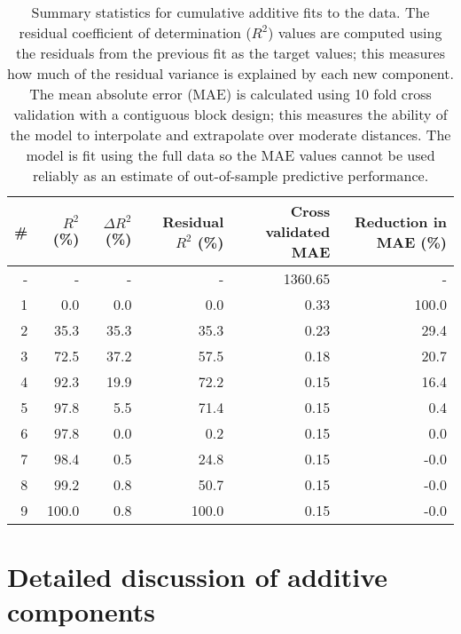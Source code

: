 \documentclass{article} %
\begin{document}
\begin{table}[htb]
\begin{center}
{\small
\begin{tabular}{|r|rrrrr|}
\hline
\bf{\#} & {$R^2$ (\%)} & {$\Delta R^2$ (\%)} & {Residual $R^2$ (\%)} & {Cross validated MAE} & Reduction in MAE (\%)\\
\hline
- & - & - & - & 1360.65 & -\\

1 & 0.0 & 0.0 & 0.0 & 0.33 & 100.0\\

2 & 35.3 & 35.3 & 35.3 & 0.23 & 29.4\\

3 & 72.5 & 37.2 & 57.5 & 0.18 & 20.7\\

4 & 92.3 & 19.9 & 72.2 & 0.15 & 16.4\\

5 & 97.8 & 5.5 & 71.4 & 0.15 & 0.4\\

6 & 97.8 & 0.0 & 0.2 & 0.15 & 0.0\\

7 & 98.4 & 0.5 & 24.8 & 0.15 & -0.0\\

8 & 99.2 & 0.8 & 50.7 & 0.15 & -0.0\\

9 & 100.0 & 0.8 & 100.0 & 0.15 & -0.0\\

\hline
\end{tabular}
\caption{
Summary statistics for cumulative additive fits to the data.
The residual coefficient of determination ($R^2$) values are computed using the residuals from the previous fit as the target values; this measures how much of the residual variance is explained by each new component.
The mean absolute error (MAE) is calculated using 10 fold cross validation with a contiguous block design; this measures the ability of the model to interpolate and extrapolate over moderate distances.
The model is fit using the full data so the MAE values cannot be used reliably as an estimate of out-of-sample predictive performance.
}
\label{table:stats}
}
\end{center}
\end{table}

\section{Detailed discussion of additive components}
\end{document}
